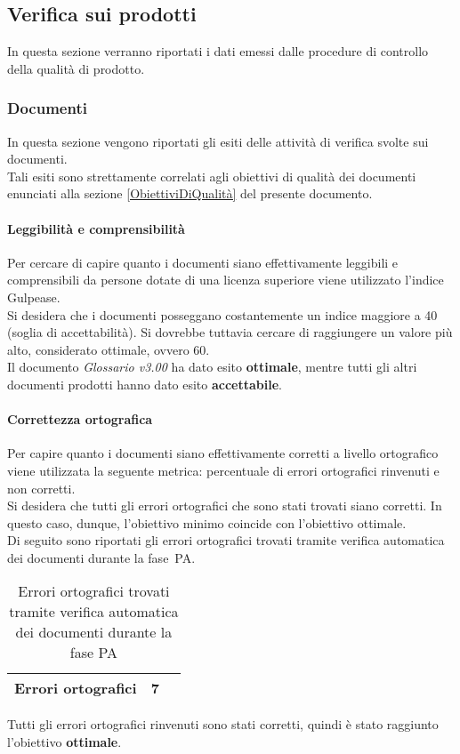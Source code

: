 \documentclass[../PianoDiQualifica.tex]{subfiles}
\begin{document}
\begin{appendices}
			
	\subsection{Verifica sui prodotti}
	In questa sezione verranno riportati i dati emessi dalle procedure di controllo della qualità di prodotto\g.
		\subsubsection{Documenti}
		In questa sezione vengono riportati gli esiti delle attività di verifica svolte sui documenti.\\
		Tali esiti sono strettamente correlati agli obiettivi di qualità dei documenti enunciati alla sezione \ref{ObiettiviDiQualità} del presente documento.
			
			\paragraph{Leggibilità e comprensibilità}
			Per cercare di capire quanto i documenti siano effettivamente leggibili e comprensibili da persone dotate di una licenza superiore viene utilizzato l’indice Gulpease\g.\\
			Si desidera che i documenti posseggano costantemente un indice maggiore a 40 (soglia di accettabilità). Si dovrebbe tuttavia cercare di raggiungere un valore più alto, considerato ottimale, ovvero 60.\\
			Il documento \textit{Glossario v3.00} ha dato esito \textbf{ottimale}, mentre tutti gli altri documenti prodotti hanno dato esito \textbf{accettabile}.
			
			\paragraph{Correttezza ortografica}
			Per capire quanto i documenti siano effettivamente corretti a livello ortografico viene utilizzata la seguente metrica: percentuale di errori ortografici rinvenuti e non corretti.\\
			Si desidera che tutti gli errori ortografici che sono stati trovati siano corretti. In questo caso, dunque, l'obiettivo minimo coincide con l'obiettivo ottimale.\\
			Di seguito sono riportati gli errori ortografici trovati tramite verifica automatica dei documenti durante la fase\g\ PA.
			\begin{table}[H]
				\centering
				\begin{tabular}{l * {2}{c}}
					\midrule
					Errori ortografici & 7 \\
					\midrule
				\end{tabular}
				\caption{Errori ortografici trovati tramite verifica automatica dei documenti durante la fase PA}
				\label{tab:errori_automatica}
			\end{table}
			Tutti gli errori ortografici rinvenuti sono stati corretti, quindi è stato raggiunto l'obiettivo \textbf{ottimale}.
			

\end{appendices}
\end{document}

